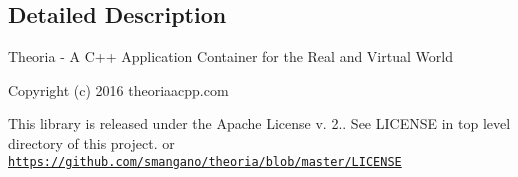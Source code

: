 \subsection{Detailed Description}
Theoria -\/ A C++ Application Container for the Real and Virtual World

Copyright (c) 2016 theoriaacpp.\+com

This library is released under the Apache License v. 2.. See L\+I\+C\+E\+N\+S\+E in top level directory of this project. or \href{https://github.com/smangano/theoria/blob/master/LICENSE}{\tt https\+://github.\+com/smangano/theoria/blob/master/\+L\+I\+C\+E\+N\+S\+E} 